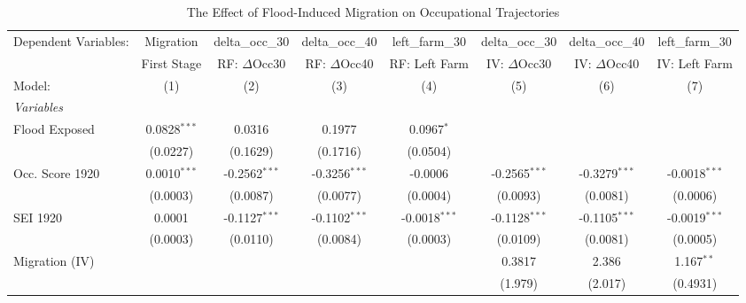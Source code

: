 
\begin{table}[htbp]
   \caption{\label{tab:main} The Effect of Flood-Induced Migration on Occupational Trajectories}
   \centering
   \begin{adjustbox}{max width=\textwidth}
   \begin{tabular}{lccccccc}
      \tabularnewline \midrule \midrule
      Dependent Variables:          & Migration      & delta\_occ\_30   & delta\_occ\_40   & left\_farm\_30   & delta\_occ\_30   & delta\_occ\_40   & left\_farm\_30\\    
                                    & First Stage    & RF: $\Delta$Occ30       & RF: $\Delta$Occ40       & RF: Left Farm    & IV: $\Delta$Occ30       & IV: $\Delta$Occ40       & IV: Left Farm \\   
      Model:                        & (1)            & (2)              & (3)              & (4)              & (5)              & (6)              & (7)\\  
      \midrule
      \emph{Variables}\\
      Flood Exposed                 & 0.0828$^{***}$ & 0.0316           & 0.1977           & 0.0967$^{*}$     &                  &                  &   \\   
                                    & (0.0227)       & (0.1629)         & (0.1716)         & (0.0504)         &                  &                  &   \\   
      Occ. Score 1920               & 0.0010$^{***}$ & -0.2562$^{***}$  & -0.3256$^{***}$  & -0.0006          & -0.2565$^{***}$  & -0.3279$^{***}$  & -0.0018$^{***}$\\   
                                    & (0.0003)       & (0.0087)         & (0.0077)         & (0.0004)         & (0.0093)         & (0.0081)         & (0.0006)\\   
      SEI 1920                      & 0.0001         & -0.1127$^{***}$  & -0.1102$^{***}$  & -0.0018$^{***}$  & -0.1128$^{***}$  & -0.1105$^{***}$  & -0.0019$^{***}$\\   
                                    & (0.0003)       & (0.0110)         & (0.0084)         & (0.0003)         & (0.0109)         & (0.0081)         & (0.0005)\\   
      Migration (IV)                &                &                  &                  &                  & 0.3817           & 2.386            & 1.167$^{**}$\\   
                                    &                &                  &                  &                  & (1.979)          & (2.017)          & (0.4931)\\   

\end{tabular}
\end{adjustbox}
\end{table}
